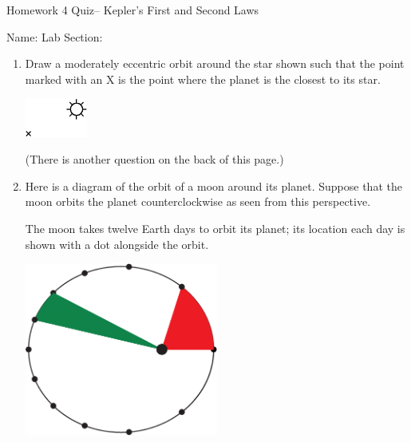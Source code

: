 \documentclass[12pt]{article}
\begin{document}
\Large

\begin{center}
	\sc \Large Homework 4 Quiz-- Kepler's First and Second Laws
	
	Name: \underline{\hspace{2in}} Lab Section: \underline{\hspace{2in}}
\end{center}
\normalsize





\begin{enumerate}
	\item Draw a moderately eccentric orbit around the star shown such that the point marked with an X is the point where the planet is the closest to its star.
	
	\vspace{2in}
	
	\begin{center}
	\includegraphics[width=0.16\textwidth]{quiz1-crop.pdf}
	\end{center}

	\vspace{2in}

\vfill

\begin{center}

(There is another question on the back of this page.)	

\end{center}

	\newpage
	
	\item Here is a diagram of the orbit of a moon around its planet. Suppose that the moon orbits the planet counterclockwise as seen from this perspective.
	
	The moon takes twelve Earth days to orbit its planet; its location each day is shown with a dot alongside the orbit.
	
	
	\begin{center}
		\includegraphics[width=0.5\textwidth]{quiz-two-crop.png}
	\end{center}
	

\end{enumerate}
\end{document}
